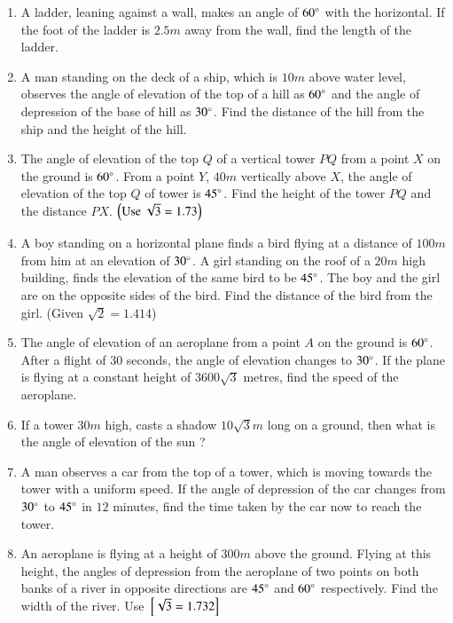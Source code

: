 \begin{enumerate}[label=\thesubsection.\arabic*.,ref=\thesubsection.\theenumi]
\hfill{}
\item A ladder, leaning against a wall, makes an angle of $60 \degree$ with the horizontal. If the foot of the ladder is $2. 5m$ away from the wall, find the length of the ladder. 
\hfill{}\item  A man standing on the deck of a ship, which is $10m$ above water level, observes the angle of elevation of the top of a hill as $ 60\degree $ and the angle of depression of the base of hill as $ 30 \degree $. Find the distance of the hill from the ship and the height of the hill.
\hfill{}\item The angle of elevation of the top $Q$ of a vertical tower $PQ$ from a point $X$ on the ground is $ 60\degree $. From a point $Y$, $40m$ vertically above $X$, the angle of elevation of the top $Q$ of tower is $ 45 \degree $. Find the height of the tower $PQ$ and the distance $PX$. $\left(\text{Use }\sqrt{3} = 1.73\right)$
\hfill{}
\item A boy standing on a horizontal plane finds a bird flying at a distance of $100 m$ from him at an elevation of $30\degree$. A girl standing on the roof of a $20 m$ high building, finds the elevation of the same bird to be $45\degree$. The boy and the girl are on the opposite sides of the bird. Find the distance of the bird from the girl. (Given ${\sqrt 2}= 1.414$)
%
\hfill{}\item The angle of elevation of an aeroplane from a point $A$ on the ground is $60\degree$. After a flight of $30$ seconds, the angle of elevation changes to $30\degree$. If the plane is flying at a constant height of $3600\sqrt 3 $ metres, find the speed of the aeroplane.
%
\hfill{}
\item If a tower $30m$ high, casts a shadow $10\sqrt{3}m$ long on a ground, then what is the angle of elevation of the sun ?
\hfill{}\item A man observes a car from the top of a tower, which is  moving towards the tower with a uniform speed. If the angle of depression of the car changes from $30\degree$ to $45\degree$ in $12$ minutes, find the time taken by the car now to reach the tower.
\hfill{}\item An aeroplane is flying at a height of $300 m$ above the ground. Flying at this height, the angles of depression from the aeroplane of two points on both banks of a river in opposite directions are $45\degree$ and $60\degree$ respectively. Find the width of the river. 
\hfill Use ${}\left[\sqrt 3 = 1.732\right]$

\end{enumerate}

